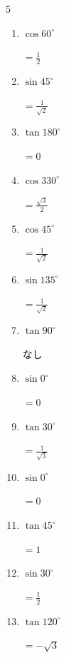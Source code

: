 \begin{multicols}{5}
\begin{enumerate}
  \item $\displaystyle \cos{60^\circ}$

        $\displaystyle =\frac{1}{2}$

  \item $\displaystyle \sin{45^\circ}$

        $\displaystyle =\frac{1}{\sqrt{2}}$

  \item $\displaystyle \tan{180^\circ}$

        $\displaystyle =0$

  \item $\displaystyle \cos{330^\circ}$

        $\displaystyle =\frac{\sqrt{3}}{2}$

  \item $\displaystyle \cos{45^\circ}$

        $\displaystyle =\frac{1}{\sqrt{2}}$

  \item $\displaystyle \sin{135^\circ}$

        $\displaystyle =\frac{1}{\sqrt{2}}$

\columnbreak %

\resetques

  \item $\displaystyle \tan{90^\circ}$

        $\displaystyle なし$

  \item $\displaystyle \sin{0^\circ}$

        $\displaystyle =0$

  \item $\displaystyle \tan{30^\circ}$

        $\displaystyle =\frac{1}{\sqrt{3}}$

  \item $\displaystyle \sin{0^\circ}$

        $\displaystyle =0$

  \item $\displaystyle \tan{45^\circ}$

        $\displaystyle =1$

  \item $\displaystyle \sin{30^\circ}$

        $\displaystyle =\frac{1}{2}$

  \item $\displaystyle \tan{120^\circ}$

        $\displaystyle =-\sqrt{3}$


\end{enumerate}
\end{multicols}
